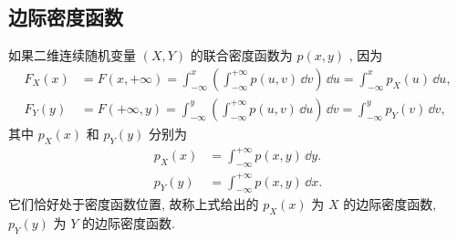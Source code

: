   \subsection{边际密度函数}\label{ssec:3.2.3}
  如果二维连续随机变量 $(X,Y)$ 的联合密度函数为 $p(x,y)$ , 因为
  \begin{align*}
  F_{X}(x) &= F(x,+\infty)=\int_{-\infty}^{x}\left( \int_{-\infty}^{+\infty}p(u,v)\,\dd v \right)\,\dd u=\int_{-\infty}^{x}p_{X}(u)\,\dd u,\\
  F_{Y}(y) &= F(+\infty,y)=\int_{-\infty}^{y}\left( \int_{-\infty}^{+\infty}p(u,v)\,\dd u \right)\,\dd v=\int_{-\infty}^{y}p_{Y}(v)\,\dd v,
  \end{align*}
  其中 $p_{X}(x)$ 和 $p_{Y}(y)$ 分别为
  \begin{align}
  p_{X}(x) &= \int_{-\infty}^{+\infty}p(x,y)\,\dd y.\label{eq:3.2.5}\\
  p_{Y}(y) &= \int_{-\infty}^{+\infty}p(x,y)\,\dd x.\label{eq:3.2.6}
  \end{align}
  它们恰好处于密度函数位置, 故称上式给出的 $p_{X}(x)$ 为 $X$ 的边际密度函数, $p_{Y}(y)$ 为 $Y$ 的边际密度函数.
  
